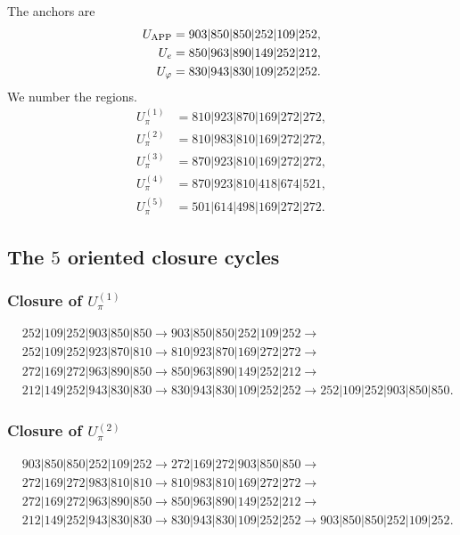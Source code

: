 The anchors are
\[
\begin{aligned}
U_{\rm APP}&=903|850|850|252|109|252,\\
U_e&=850|963|890|149|252|212,\\
U_\varphi&=830|943|830|109|252|252.
\end{aligned}
\]
We number the regions.
\[
\begin{aligned}
U_\pi^{(1)}&=810|923|870|169|272|272,\\
U_\pi^{(2)}&=810|983|810|169|272|272,\\
U_\pi^{(3)}&=870|923|810|169|272|272,\\
U_\pi^{(4)}&=870|923|810|418|674|521,\\
U_\pi^{(5)}&=501|614|498|169|272|272.
\end{aligned}
\]

\subsection{The \(5\) oriented closure cycles}

\subsubsection{Closure of \texorpdfstring{\(U_\pi^{(1)}\)}{U-pi 1}}
\begin{align*}
&252|109|252|903|850|850\to
903|850|850|252|109|252\to\\
&252|109|252|923|870|810\to
810|923|870|169|272|272\to\\
&272|169|272|963|890|850\to
850|963|890|149|252|212\to\\
&212|149|252|943|830|830\to
830|943|830|109|252|252\to
252|109|252|903|850|850.
\end{align*}

\subsubsection{Closure of \texorpdfstring{\(U_\pi^{(2)}\)}{U-pi 2}}
\begin{align*}
&903|850|850|252|109|252\to
272|169|272|903|850|850\to\\
&272|169|272|983|810|810\to
810|983|810|169|272|272\to\\
&272|169|272|963|890|850\to
850|963|890|149|252|212\to\\
&212|149|252|943|830|830\to
830|943|830|109|252|252\to
903|850|850|252|109|252.
\end{align*}

